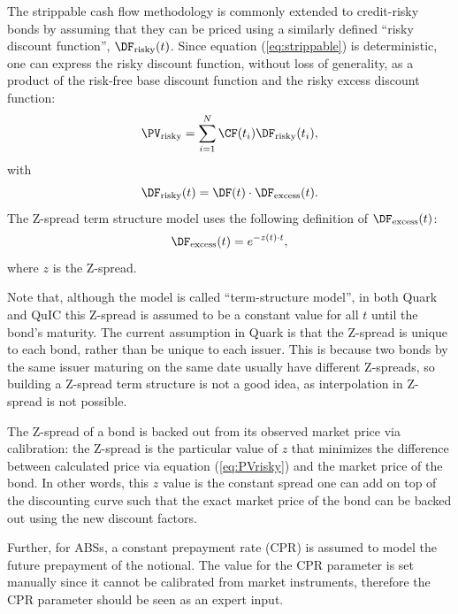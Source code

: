 \documentclass[reviewdoc]{pmv_report}  %
\begin{document}
The strippable cash flow methodology is commonly extended to credit-risky bonds by assuming that they can be priced using a similarly defined ``risky discount function'', $\DF_{\text{risky}}(t)$.
Since equation (\ref{eq:strippable}) is deterministic, one can express the risky discount function, without loss of generality, as a product of the risk-free base discount function and the risky excess discount function:
\begin{equation}\label{eq:PVrisky}
\PV_{\text{risky}} = \sum_{i=1}^{N} \CF(t_i)\DF_{\text{risky}}(t_i),
\end{equation}
with
\begin{equation}\label{eq:Zrisky}
\DF_{\text{risky}}(t) = \DF(t)\cdot \DF_{\text{excess}}(t).
\end{equation}
The Z-spread term structure model uses the following definition of $\DF_{\text{excess}}(t)$:
\begin{equation}\label{eq:Zexcess}
  \DF_{\text{excess}}(t) = e^{-z(t)\cdot t},
\end{equation}
where $z$ is the Z-spread.

Note that, although the model is called ``term-structure model'', in both Quark and QuIC this Z-spread is assumed to be a constant value for all $t$ until the bond's maturity.
The current assumption in Quark is that the Z-spread is unique to each bond, rather than be unique to each issuer.
This is because two bonds by the same issuer maturing on the same
date usually have different Z-spreads, so building a Z-spread term structure is not a good idea, as interpolation in Z-spread is not possible.

The Z-spread of a bond is backed out from its observed market price via calibration: the Z-spread is the particular value of $z$ that minimizes the difference between calculated price via equation (\ref{eq:PVrisky}) and the market price of the bond.
In other words, this $z$ value is the constant spread one can add on top of the discounting curve such that the exact market price of the bond can be backed out using the new discount factors.

Further, for ABSs, a constant prepayment rate (CPR) is assumed to model the future prepayment of the notional.
The value for the CPR parameter is set manually since it cannot be calibrated from market instruments, therefore the CPR parameter should be seen as an expert input.
\end{document}
